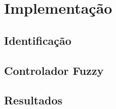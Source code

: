 %

\chapter{Implementação}

\section{Identificação}

\section{Controlador Fuzzy}

\section{Resultados}

%

